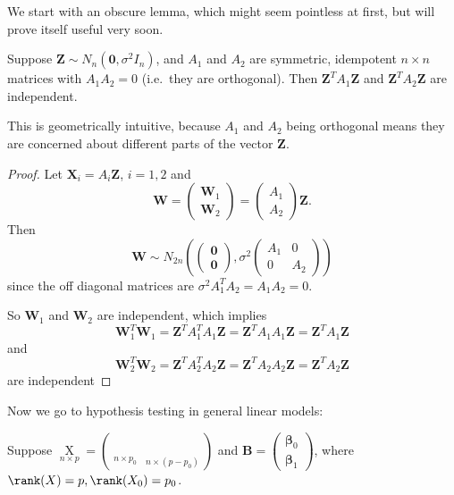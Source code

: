 \documentclass[a4paper]{article}
\begin{document}
We start with an obscure lemma, which might seem pointless at first, but will prove itself useful very soon.
\begin{lemma}
  Suppose $\mathbf{Z} \sim N_n(\mathbf{0}, \sigma^2 I_n)$, and $A_1$ and $A_2$ are symmetric, idempotent $n\times n$ matrices with $A_1A_2 = 0$ (i.e.\ they are orthogonal). Then $\mathbf{Z}^T A_1 \mathbf{Z}$ and $\mathbf{Z}^TA_2 \mathbf{Z}$ are independent.
\end{lemma}
This is geometrically intuitive, because $A_1$ and $A_2$ being orthogonal means they are concerned about different parts of the vector $\mathbf{Z}$.

\begin{proof}
  Let $\mathbf{X}_i = A_i \mathbf{Z}$, $i = 1, 2$ and
  \[
    \mathbf{W} =
    \begin{pmatrix}
      \mathbf{W}_1\\
      \mathbf{W}_2
    \end{pmatrix} = \begin{pmatrix} A_1\\ A_2\end{pmatrix}\mathbf{Z}.
  \]
  Then
  \[
    \mathbf{W}\sim N_{2n}\left(
    \begin{pmatrix}
      \mathbf{0}\\
      \mathbf{0}
    \end{pmatrix}, \sigma^2
    \begin{pmatrix}
      A_1 & 0\\
      0 & A_2
    \end{pmatrix}\right)
  \]
  since the off diagonal matrices are $\sigma^2 A_1^TA_2 = A_1A_2 = 0$.

  So $\mathbf{W}_1$ and $\mathbf{W}_2$ are independent, which implies
  \[
    \mathbf{W}_1^T \mathbf{W}_1 = \mathbf{Z}^TA_1^TA_1 \mathbf{Z} = \mathbf{Z}^T A_1A_1 \mathbf{Z} = \mathbf{Z}^T A_1 \mathbf{Z}
  \]
  and
  \[
    \mathbf{W}_2^T \mathbf{W}_2 = \mathbf{Z}^TA_2^TA_2 \mathbf{Z} = \mathbf{Z}^T A_2A_2 \mathbf{Z} = \mathbf{Z}^T A_2 \mathbf{Z}
  \]
  are independent
\end{proof}
Now we go to hypothesis testing in general linear models:

Suppose $\mathop{X}\limits_{n \times p} = \left(\mathop{X_0}\limits_{n \times p_0}\, \mathop{X_1}\limits_{n \times (p - p_0)}\right)$ and $\mathbf{B} = \begin{pmatrix}\boldsymbol\beta_0 \\ \boldsymbol\beta_1\end{pmatrix}$, where $\rank (X) = p, \rank(X_0) = p_0$.
\end{document}
